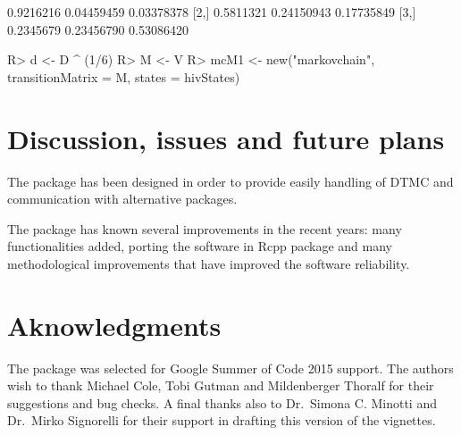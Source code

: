 \documentclass[
  nojss]{jss}
\begin{document}
\begin{CodeChunk}


\begin{CodeOutput}
          [,1]       [,2]       [,3]
[1,] 0.9216216 0.04459459 0.03378378
[2,] 0.5811321 0.24150943 0.17735849
[3,] 0.2345679 0.23456790 0.53086420
\end{CodeOutput}

\begin{CodeInput}
R> d <- D ^ (1/6)
R> M <- V %
R> mcM1 <- new("markovchain", transitionMatrix = M, states = hivStates)
\end{CodeInput}
\end{CodeChunk}

\hypertarget{discussion-issues-and-future-plans}{%
\section{Discussion, issues and future plans}\label{discussion-issues-and-future-plans}}

The  package has been designed in order to provide easily handling of DTMC and communication with alternative packages.

The package has known several improvements in the recent years: many functionalities added, porting the software in Rcpp  package \citep{RcppR} and many methodological improvements that have improved the software reliability.

\hypertarget{sec:aknowledgements}{%
\section{Aknowledgments}\label{sec:aknowledgements}}

The package was selected for Google Summer of Code 2015 support. The authors wish to thank Michael Cole, Tobi Gutman and Mildenberger Thoralf for their suggestions and bug checks. A final thanks also to Dr.~Simona C. Minotti and Dr.~Mirko Signorelli for their support in drafting this version of the vignettes.

\clearpage

\renewcommand\refname{References}

\end{document}
